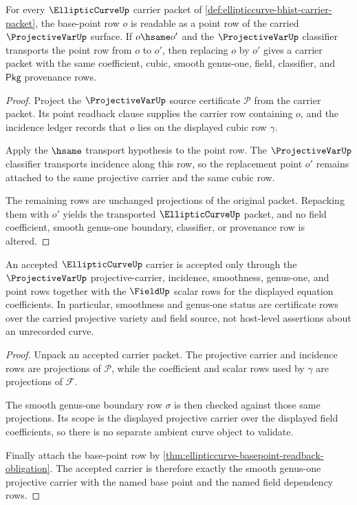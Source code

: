 \begin{theorem}\label{thm:ellipticcurve-basepoint-readback-obligation}
For every $\EllipticCurveUp$ carrier packet of \autoref{def:ellipticcurve-bhist-carrier-packet}, the base-point row $o$ is readable as a point row of the carried $\ProjectiveVarUp$ surface. If $o\hsame o'$ and the $\ProjectiveVarUp$ classifier transports the point row from $o$ to $o'$, then replacing $o$ by $o'$ gives a carrier packet with the same coefficient, cubic, smooth genus-one, field, classifier, and $\mathsf{Pkg}$ provenance rows.
\end{theorem}
\begin{proof}
Project the $\ProjectiveVarUp$ source certificate $\mathcal{P}$ from the carrier packet. Its point readback clause supplies the carrier row containing $o$, and the incidence ledger records that $o$ lies on the displayed cubic row $\gamma$.

Apply the $\hsame$ transport hypothesis to the point row. The $\ProjectiveVarUp$ classifier transports incidence along this row, so the replacement point $o'$ remains attached to the same projective carrier and the same cubic row.

The remaining rows are unchanged projections of the original packet. Repacking them with $o'$ yields the transported $\EllipticCurveUp$ packet, and no field coefficient, smooth genus-one boundary, classifier, or provenance row is altered.
\end{proof}

\begin{theorem}\label{thm:ellipticcurve-smooth-projective-carrier-obligation}
An accepted $\EllipticCurveUp$ carrier is accepted only through the $\ProjectiveVarUp$ projective-carrier, incidence, smoothness, genus-one, and point rows together with the $\FieldUp$ scalar rows for the displayed equation coefficients. In particular, smoothness and genus-one status are certificate rows over the carried projective variety and field source, not host-level assertions about an unrecorded curve.
\end{theorem}
\begin{proof}
Unpack an accepted carrier packet. The projective carrier and incidence rows are projections of $\mathcal{P}$, while the coefficient and scalar rows used by $\gamma$ are projections of $\mathcal{F}$.

The smooth genus-one boundary row $\sigma$ is then checked against those same projections. Its scope is the displayed projective carrier over the displayed field coefficients, so there is no separate ambient curve object to validate.

Finally attach the base-point row by \autoref{thm:ellipticcurve-basepoint-readback-obligation}. The accepted carrier is therefore exactly the smooth genus-one projective carrier with the named base point and the named field dependency rows.
\end{proof}


